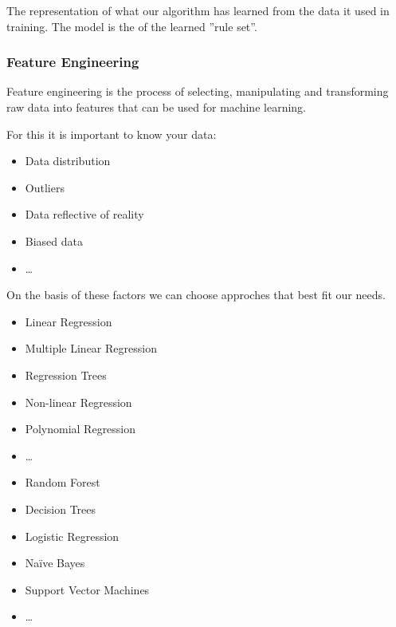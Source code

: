 \documentclass[
../../EiKI_Summary.tex,
]
{subfiles}
\begin{document}
\begin{defbox}
    [Model]
    The representation of what our algorithm has learned from the data it used in training. The model is the  of the learned ''rule set''.
\end{defbox}

\subsubsection{Feature Engineering}
Feature engineering is the process of selecting, manipulating and transforming raw data into features that can be used for machine learning.

For this it is important to know your data:
\begin{itemize}
    \item Data distribution
    \item Outliers
    \item Data reflective of reality
    \item Biased data
    \item \dots
\end{itemize}

On the basis of these factors we can choose approches that best fit our needs.

\begin{minipage}
    [t]{0.5\textwidth}
    \begin{itemize}
        \item Linear Regression
        \item Multiple Linear Regression
        \item Regression Trees
        \item Non-linear Regression
        \item Polynomial Regression
        \item \dots
    \end{itemize}
\end{minipage}
\begin{minipage}
    [t]{0.5\textwidth}
    \begin{itemize}
        \item Random Forest
        \item Decision Trees
        \item Logistic Regression
        \item Na\"ive Bayes
        \item Support Vector Machines
        \item \dots
    \end{itemize}
\end{minipage}
\end{document}
